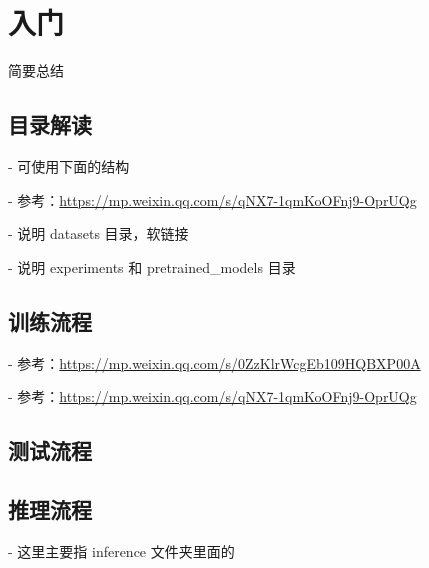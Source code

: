 \documentclass[../main.tex]{subfiles}
\begin{document}
\chapter{入门}
\vspace{-2cm}

简要总结

\section{目录解读}

- 可使用下面的结构

- 参考：\url{https://mp.weixin.qq.com/s/qNX7-1qmKoOFnj9-OprUQg}

- 说明 datasets 目录，软链接

- 说明 experiments 和 pretrained\_models 目录
\newline


\section{训练流程}

- 参考：\url{https://mp.weixin.qq.com/s/0ZzKlrWcgEb109HQBXP00A}

- 参考：\url{https://mp.weixin.qq.com/s/qNX7-1qmKoOFnj9-OprUQg}

\section{测试流程}

\section{推理流程}

- 这里主要指 inference 文件夹里面的
\end{document}

